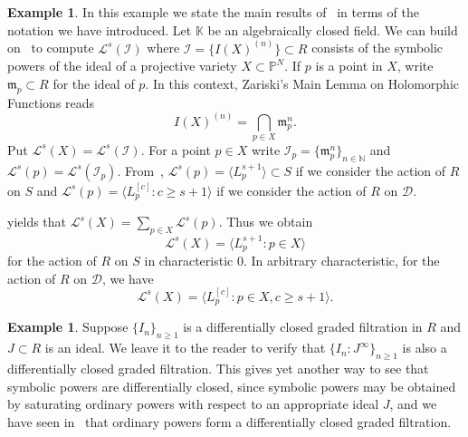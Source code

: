 \documentclass[12pt, reqno]{amsart}
\numberwithin{equation}{section}
\newcommand{\fm}{{\mathfrak m}}
\newcommand{\N}{{\mathbb N}}
\renewcommand{\P}{{\mathbb P}}
\newcommand{\kk}{\mathbb{K}}
\newcommand{\cL}{{\mathcal L}}
\newcommand{\I}{{\mathcal I}}
\theoremstyle{plain} %
\theoremstyle{definition}
\newtheorem{ex}[thm]{Example}
\theoremstyle{remark}
\begin{document}
\begin{ex}\label{ex:LsForSymbolicPowers}
	In this example we state the main results of~\cite{EI95} in terms of the notation we have introduced.  Let $\kk$ be an algebraically closed field.  We can build on~ to compute $\cL^s(\I)$ where $\I=\{I(X)^{(n)}\}\subset R$ consists of the symbolic powers of the ideal of a projective variety $X\subset\P^N$.  If $p$ is a point in $X$, write $\fm_p\subset R$ for the ideal of $p$.  In this context, Zariski's Main Lemma on Holomorphic Functions reads
	\[
	I(X)^{(n)}=\bigcap_{p\in X} \mathfrak{m}_p^n.
	\]
	Put $\cL^s(X)=\cL^s(\I)$.  For a point $p\in X$ write $\I_p=\{\mathfrak{m}_p^n\}_{n\in\N}$ and $\cL^s(p)=\cL^s(\I_p)$.  From~, $\cL^s(p)=\langle L_p^{s+1}\rangle\subset S$ if we consider the action of $R$ on $S$ and $\cL^s(p)=\langle L_p^{[c]}: c\ge s+1\rangle$ if we consider the action of $R$ on $\mathcal{D}$.

  yields that $\cL^s(X)=\sum_{p\in X}\cL^s(p)$.  Thus we obtain
\[
\cL^s(X)=\langle L_p^{s+1}: p\in X\rangle
\] 
for the action of $R$ on $S$ in characteristic $0$.  In arbitrary characteristic, for the action of $R$ on $\mathcal{D}$, we have
\[
\cL^s(X)=\langle L_p^{[c]}: p\in X,c\ge s+1\rangle.
\]
\end{ex}

\begin{ex}
Suppose $\{I_n\}_{n\ge 1}$ is a differentially closed graded filtration in $R$ and $J\subset R$ is an ideal.  We leave it to the reader to verify that $\{I_n:J^\infty\}_{n\ge 1}$ is also a differentially closed graded filtration.  This gives yet another way to see that symbolic powers are differentially closed, since symbolic powers may be obtained by saturating ordinary powers with respect to an appropriate ideal $J$, and we have seen in~ that ordinary powers form a differentially closed graded filtration.
\end{ex}
\end{document}
